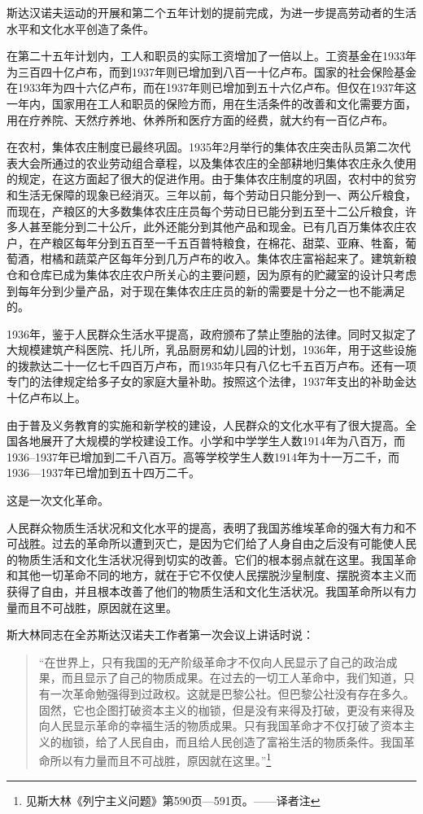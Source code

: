 斯达汉诺夫运动的开展和第二个五年计划的提前完成，为进一步提高劳动者的生活水平和文化水平创造了条件。

在第二十五年计划内，工人和职员的实际工资增加了一倍以上。工资基金在1933年为三百四十亿卢布，而到1937年则已增加到八百一十亿卢布。国家的社会保险基金在1933年为四十六亿卢布，而在1937年则已增加到五十六亿卢布。但仅在1937年这一年内，国家用在工人和职员的保险方而，用在生活条件的改善和文化需要方面，用在疗养院、天然疗养地、休养所和医疗方面的经费，就大约有一百亿卢布。

在农村，集体农庄制度已最终巩固。1935年2月举行的集体农庄突击队员第二次代表大会所通过的农业劳动组合章程，以及集体农庄的全部耕地归集体农庄永久使用的规定，在这方面起了很大的促进作用。由于集体农庄制度的巩固，农村中的贫穷和生活无保障的现象已经消灭。三年以前，每个劳动日只能分到一、两公斤粮食，而现在，产粮区的大多数集体农庄庄员每个劳动日已能分到五至十二公斤粮食，许多人甚至能分到二十公斤，此外还能分到其他产品和现金。已有几百万集体农庄农户，在产粮区每年分到五百至一千五百普特粮食，在棉花、甜菜、亚麻、牲畜，葡萄酒，柑橘和蔬菜产区每年分到几万卢布的收入。集体农庄富裕起来了。建筑新粮仓和仓库已成为集体农庄农户所关心的主要问题，因为原有的贮藏室的设计只考虑到每年分到少量产品，对于现在集体农庄庄员的新的需要是十分之一也不能满足的。

1936年，鉴于人民群众生活水平提高，政府颁布了禁止堕胎的法律。同时又拟定了大规模建筑产科医院、托儿所，乳品厨房和幼儿园的计划，1936年，用于这些设施的拨款达二十一亿七千四百万卢布，而1935年只有八亿七千五百万卢布。还有一项专门的法律规定给多子女的家庭大量补助。按照这个法律，1937年支出的补助金达十亿卢布以上。

由于普及义务教育的实施和新学校的建设，人民群众的文化水平有了很大提高。全国各地展开了大规模的学校建设工作。小学和中学学生人数1914年为八百万，而1936--1937年已增加到二千八百万。高等学校学生人数1914年为十一万二千，而1936—1937年已增加到五十四万二千。

这是一次文化革命。

人民群众物质生活状况和文化水平的提高，表明了我国苏维埃革命的强大有力和不可战胜。过去的革命所以遭到灭亡，是因为它们给了人身自由之后没有可能使人民的物质生活和文化生活状况得到切实的改善。它们的根本弱点就在这里。我国革命和其他一切革命不同的地方，就在于它不仅使人民摆脱沙皇制度、摆脱资本主义而获得了自由，并且根本改善了他们的物质生活和文化生活状况。我国革命所以有力量而且不可战胜，原因就在这里。

斯大林同志在全苏斯达汉诺夫工作者第一次会议上讲话时说：

\begin{quotation}
“在世界上，只有我国的无产阶级革命才不仅向人民显示了自己的政治成果，而且显示了自己的物质成果。在过去的一切工人革命中，我们知道，只有一次革命勉强得到过政权。这就是巴黎公社。但巴黎公社没有存在多久。固然，它也企图打破资本主义的枷锁，但是没有来得及打破，更没有来得及向人民显示革命的幸福生活的物质成果。只有我国革命才不仅打破了资本主义的枷锁，给了人民自由，而且给人民创造了富裕生活的物质条件。我国革命所以有力量而且不可战胜，原因就在这里。”\footnote{见斯大林《列宁主义问题》第590页—591页。——译者注}
\end{quotation}


